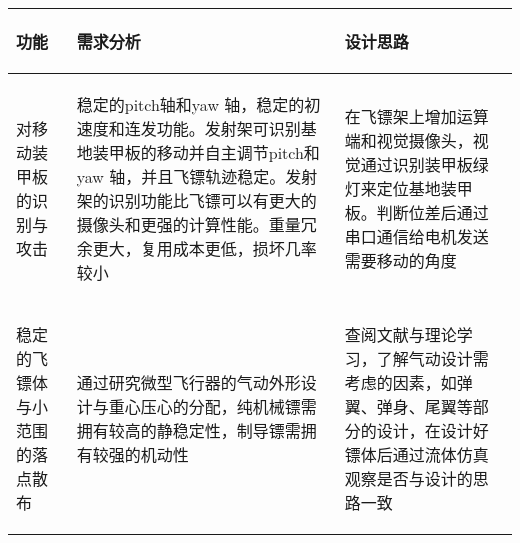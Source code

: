 
\begin{longtable}{ p{2cm} | p{7.8cm} | p{6cm} |}

    \hline

    \endfoot
    
    \rowcolor{tabhdcolor}

        \begin{center}
            功能
        \end{center} &
        \begin{center}
            需求分析
        \end{center} &
        \begin{center}
            设计思路
        \end{center} \\

    \hline

    \endhead

        \begin{center}
            对移动装甲板的识别与攻击
        \end{center} &
        \begin{center}
            稳定的pitch轴和yaw 轴，稳定的初速度和连发功能。发射架可识别基地装甲板的移动并自主调节pitch和 yaw 轴，并且飞镖轨迹稳定。发射架的识别功能比飞镖可以有更大的摄像头和更强的计算性能。重量冗余更大，复用成本更低，损坏几率较小
        \end{center} &
        \begin{center}
            在飞镖架上增加运算端和视觉摄像头，视觉通过识别装甲板绿灯来定位基地装甲板。判断位差后通过串口通信给电机发送需要移动的角度
        \end{center} \\
        
    \hline

        \begin{center}
            稳定的飞镖体与小范围的落点散布
        \end{center} &
        \begin{center}
            通过研究微型飞行器的气动外形设计与重心压心的分配，纯机械镖需拥有较高的静稳定性，制导镖需拥有较强的机动性
        \end{center} &
        \begin{center}
            查阅文献与理论学习，了解气动设计需考虑的因素，如弹翼、弹身、尾翼等部分的设计，在设计好镖体后通过流体仿真观察是否与设计的思路一致
        \end{center} \\
        

\end{longtable}
